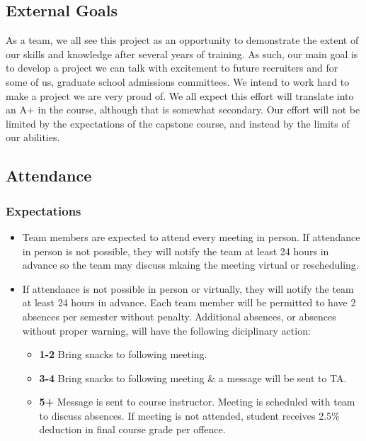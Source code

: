 \documentclass{article}
\begin{document}

\subsection*{External Goals}

As a team, we all see this project as an opportunity to demonstrate the extent of our skills and knowledge after several years of training.
As such, our main goal is to develop a project we can talk with excitement to future recruiters and for some of us, graduate school admissions committees.
We intend to work hard to make a project we are very proud of. We all expect this effort will translate into an A+ in the course, although that is somewhat
secondary. Our effort will not be limited by the expectations of the capstone course, and instead by the limits of our abilities.

\subsection*{Attendance}

\subsubsection*{Expectations}
\begin{itemize}
\item Team members are expected to attend every meeting in person. If attendance in person is not possible, they will notify the team at least 24 hours 
in advance so the team may discuss mkaing the meeting virtual or rescheduling.
\item If attendance is not possible in person or virtually, they will notify the team at least 24 hours in advance. Each team member will be permitted to have 2 absences per semester 
without penalty. Additional absences, or absences without proper warning, will have the following diciplinary action:

\begin{itemize}
  \item[] \textbf{1-2} Bring snacks to following meeting.
  \item[] \textbf{3-4} Bring snacks to following meeting \& a message will be sent to TA.
  \item[] \textbf{5+} Message is sent to course instructor. Meeting is scheduled with team to discuss absences. If meeting is not attended, student receives 2.5\% deduction in final course grade per offence.
\end{itemize}
\end{itemize}
\end{document}

